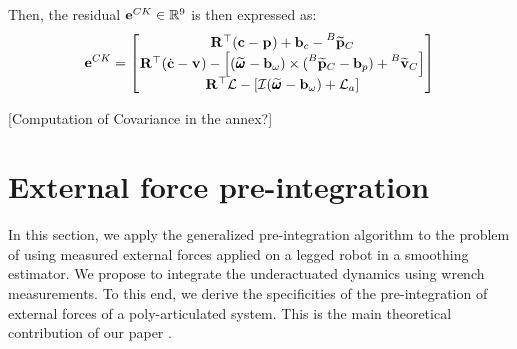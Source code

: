Then, the residual ${\bf e}^{CK} \in \mathbb{R}^9$ is then expressed as:
%
\begin{equation}
    {\bf e}^{CK}=
    \begin{bmatrix}
        \prescript{}{}{{\bf R}}_{}^{\top}({\bf c} - \prescript{}{}{{\bf p}}_{}) + {\bf b}_{c} - \prescript{B}{}{\widetilde{{\bf p}}}_{C}
        \\
        \prescript{}{}{{\bf R}}_{}^{\top}(\dot{{\bf c}} - \prescript{}{}{{\bf v}}_{}) - \left[(\prescript{}{}{\widetilde{\pmb{\omega}}}_{} - {\bf b}_{\omega}) \times (\prescript{B}{}{\widetilde{{\bf p}}}_{C} -  {\bf b}_{p}) + \prescript{B}{}{\widetilde{{\bf v}}}_{C} \right]
        \\
        \prescript{}{}{{\bf R}}_{}^{\top}\mathcal{L} - \left[\mathcal{I} (\prescript{}{}{\widetilde{\pmb{\omega}}}_{} - {\bf b}_{\omega}) + \mathcal{L}_a \right]
    \end{bmatrix}
    \label{eq:CKFactor}
\end{equation}

[Computation of Covariance in the annex?]



\section{External force pre-integration}
In this section, we apply the generalized pre-integration algorithm to the problem of using measured external
forces applied on a legged robot in a smoothing estimator. We propose to integrate the underactuated dynamics  using wrench measurements.
To this end, we derive the specificities of the pre-integration of external forces of a poly-articulated system. This is the main theoretical contribution
of our paper \cite{fourmy2021contact}.

